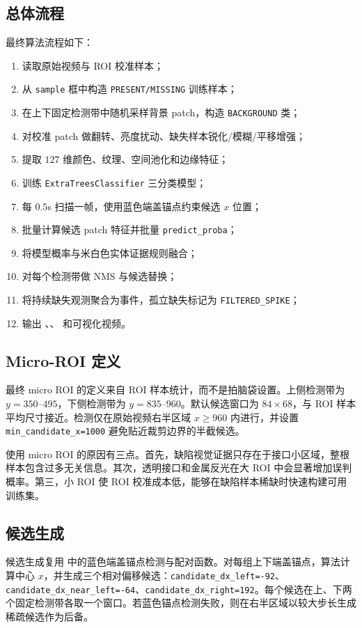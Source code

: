 \documentclass[a4paper,12pt]{article}
\newcommand{\code}[1]{\texttt{#1}}
\begin{document}
\subsection{总体流程}
最终算法流程如下：
\begin{enumerate}[label=\arabic*.]
    \item 读取原始视频与 ROI 校准样本；
    \item 从 \code{sample} 框中构造 \code{PRESENT/MISSING} 训练样本；
    \item 在上下固定检测带中随机采样背景 patch，构造 \code{BACKGROUND} 类；
    \item 对校准 patch 做翻转、亮度扰动、缺失样本锐化/模糊/平移增强；
    \item 提取 $127$ 维颜色、纹理、空间池化和边缘特征；
    \item 训练 \code{ExtraTreesClassifier} 三分类模型；
    \item 每 $0.5$s 扫描一帧，使用蓝色端盖锚点约束候选 $x$ 位置；
    \item 批量计算候选 patch 特征并批量 \code{predict\_proba}；
    \item 将模型概率与米白色实体证据规则融合；
    \item 对每个检测带做 NMS 与候选替换；
    \item 将持续缺失观测聚合为事件，孤立缺失标记为 \code{FILTERED\_SPIKE}；
    \item 输出 、、 和可视化视频。
\end{enumerate}

\subsection{Micro-ROI 定义}
最终 micro ROI 的定义来自 ROI 样本统计，而不是拍脑袋设置。上侧检测带为 $y=350$--$495$，下侧检测带为 $y=835$--$960$。默认候选窗口为 $84\times68$，与 ROI 样本平均尺寸接近。检测仅在原始视频右半区域 $x\geq960$ 内进行，并设置 \code{min\_candidate\_x=1000} 避免贴近裁剪边界的半截候选。

使用 micro ROI 的原因有三点。首先，缺陷视觉证据只存在于接口小区域，整根样本包含过多无关信息。其次，透明接口和金属反光在大 ROI 中会显著增加误判概率。第三，小 ROI 使 ROI 校准成本低，能够在缺陷样本稀缺时快速构建可用训练集。

\subsection{候选生成}
候选生成复用  中的蓝色端盖锚点检测与配对函数。对每组上下端盖锚点，算法计算中心 $x$，并生成三个相对偏移候选：\code{candidate\_dx\_left=-92}、\code{candidate\_dx\_near\_left=-64}、\code{candidate\_dx\_right=192}。每个候选在上、下两个固定检测带各取一个窗口。若蓝色锚点检测失败，则在右半区域以较大步长生成稀疏候选作为后备。
\end{document}
